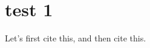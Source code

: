 \documentclass[twocolumn]{article}
\begin{document}
\section{test 1}

Let's first cite this\cite{wolf2005virtualization}, and then cite this\cite{Barham:2003:XAV:1165389.945462}.




\end{document}
